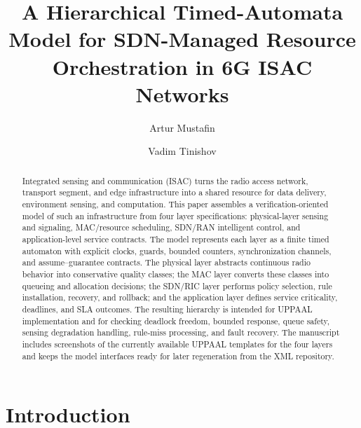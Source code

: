 \documentclass[runningheads]{llncs}
\begin{document}
\title{A Hierarchical Timed-Automata Model for SDN-Managed Resource Orchestration in 6G ISAC Networks}

\author{Artur Mustafin \and
Vadim Tinishov}


\maketitle

\begin{abstract}
Integrated sensing and communication (ISAC) turns the radio access network, transport segment, and edge infrastructure into a shared resource for data delivery, environment sensing, and computation. This paper assembles a verification-oriented model of such an infrastructure from four layer specifications: physical-layer sensing and signaling, MAC/resource scheduling, SDN/RAN intelligent control, and application-level service contracts. The model represents each layer as a finite timed automaton with explicit clocks, guards, bounded counters, synchronization channels, and assume--guarantee contracts. The physical layer abstracts continuous radio behavior into conservative quality classes; the MAC layer converts these classes into queueing and allocation decisions; the SDN/RIC layer performs policy selection, rule installation, recovery, and rollback; and the application layer defines service criticality, deadlines, and SLA outcomes. The resulting hierarchy is intended for UPPAAL implementation and for checking deadlock freedom, bounded response, queue safety, sensing degradation handling, rule-miss processing, and fault recovery. The manuscript includes screenshots of the currently available UPPAAL templates for the four layers and keeps the model interfaces ready for later regeneration from the XML repository.

\end{abstract}

\section{Introduction}
\end{document}
